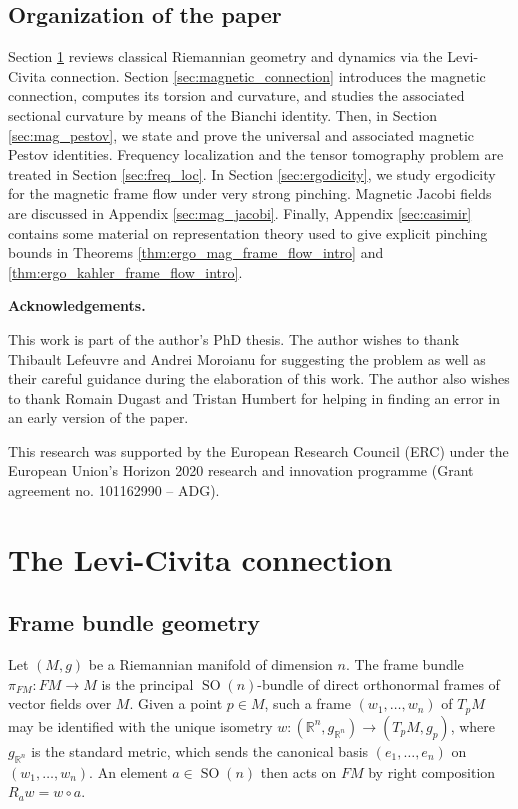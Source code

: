\documentclass[12pt]{amsart}
\numberwithin{numbering}{section}
\theoremstyle{plain}
\theoremstyle{definition}
\theoremstyle{remark}
\numberwithin{equation}{section}
\DeclareMathOperator{\SO}{SO}
\newcommand{\pfm}{\pi_{FM}}
\newcommand{\R}{\mathbb{R}}
\begin{document}
\subsection{Organization of the paper}

Section \ref{sec:levi_civita} reviews classical Riemannian geometry and dynamics via the Levi-Civita connection. Section \ref{sec:magnetic_connection} introduces the magnetic connection, computes its torsion and curvature, and studies the associated sectional curvature by means of the Bianchi identity. Then, in Section \ref{sec:mag_pestov}, we state and prove the universal and associated magnetic Pestov identities. Frequency localization and the tensor tomography problem are treated in Section \ref{sec:freq_loc}. In Section \ref{sec:ergodicity}, we study ergodicity for the magnetic frame flow under very strong pinching. Magnetic Jacobi fields are discussed in Appendix \ref{sec:mag_jacobi}. Finally, Appendix \ref{sec:casimir} contains some material on representation theory used to give explicit pinching bounds in Theorems \ref{thm:ergo_mag_frame_flow_intro} and \ref{thm:ergo_kahler_frame_flow_intro}.

\medskip

\textbf{Acknowledgements.} 

This work is part of the author's PhD thesis. The author wishes to thank Thibault Lefeuvre and Andrei Moroianu for suggesting the problem as well as their careful guidance during the elaboration of this work. The author also wishes to thank Romain Dugast and Tristan Humbert for helping in finding an error in an early version of the paper.

This research was supported by the European Research Council (ERC) under the European Union's Horizon 2020 research and innovation programme (Grant agreement no. 101162990 -- ADG). 

\section{The Levi-Civita connection} \label{sec:levi_civita}

\subsection{Frame bundle geometry} \label{sec:levi_civita_fm}

Let \( (M, g) \) be a Riemannian manifold of dimension $n$. The frame bundle $\pfm : FM \to M$ is the principal $\SO(n)$-bundle of direct orthonormal frames of vector fields over $M$. Given a point $p \in M$, such a frame $(w_1, \ldots, w_n)$ of $T_p M$ may be identified with the unique isometry $w: (\R^n, g_{\R^n}) \to (T_p M, g_p)$, where $g_{\R^n}$ is the standard metric, which sends the canonical basis $(e_1, \ldots, e_n)$ on $(w_1, \ldots, w_n)$. An element $a \in \SO(n)$ then acts on $FM$ by right composition $R_a w = w \circ a$. 
\end{document}
